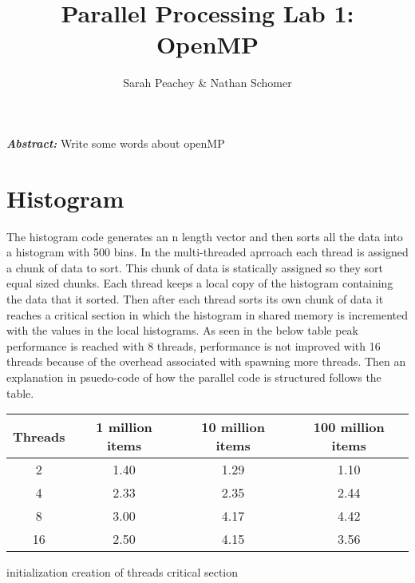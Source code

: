 \documentclass[12pt]{article}
\begin{document}
\title{Parallel Processing Lab 1: OpenMP}
\author{Sarah Peachey \& Nathan Schomer}
\maketitle

\textbf{\textit{Abstract:}} Write some words about openMP

\newpage

\section{Histogram\label{histo}}
\qquad The histogram code generates an n length vector and then sorts all
the data into a histogram with 500 bins. In the multi-threaded aprroach each
thread is assigned a chunk of data to sort. This chunk of data is statically
assigned so they sort equal sized chunks. Each thread keeps a local copy of
the histogram containing the data that it sorted. Then after each thread
sorts its own chunk of data it reaches a critical section in which the
histogram in shared memory is incremented with the values in the local
histograms. As seen in the below table peak performance is reached with 8
threads, performance is not improved with 16 threads because of the overhead
associated with spawning more threads. Then an explanation in psuedo-code of
how the parallel code is structured follows the table.  

\begin{center}
\hspace*{-2.5cm}
\begin{tabular}{@{}|c|c|c|c|}
\hline
Threads & 1 million items & 10 million items & 100 million items \\
\hline 
2 & 1.40 & 1.29 & 1.10 \\
\hline
4 & 2.33 & 2.35 & 2.44 \\
\hline
8 & 3.00 & 4.17 & 4.42 \\
\hline 
16 & 2.50 & 4.15 & 3.56 \\
\hline 
\end{tabular}
\hspace*{-2.5cm}
\end{center}

\begin{algorithm}[H]
\SetAlgoLined
{}
initialization\;
creation of threads\; 
critical section\; 
\end{algorithm}
\end{document}
